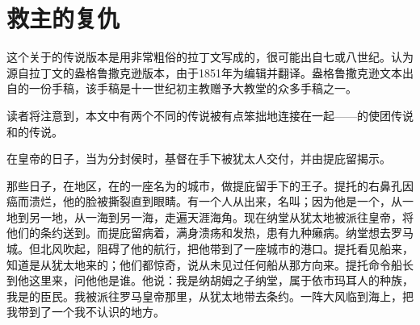 
\chapter{救主的复仇}


这个关于的传说版本是用非常粗俗的拉丁文写成的，很可能出自七或八世纪。认为源自拉丁文的盎格鲁撒克逊版本，由于1851年为编辑并翻译。盎格鲁撒克逊文本出自的一份手稿，该手稿是十一世纪初主教赠予大教堂的众多手稿之一。\par

读者将注意到，本文中有两个不同的传说被有点笨拙地连接在一起——的使团传说和的传说。\par

在皇帝的日子，当为分封侯时，基督在手下被犹太人交付，并由提庇留揭示。\par

那些日子，在地区，在的一座名为的城市，做提庇留手下的王子。提托的右鼻孔因癌而溃烂，他的脸被撕裂直到眼睛。有一个人从出来，名叫；因为他是一个，从一地到另一地，从一海到另一海，走遍天涯海角。现在纳堂从犹太地被派往皇帝，将他们的条约送到。而提庇留病着，满身溃疡和发热，患有九种癞病。纳堂想去罗马城。但北风吹起，阻碍了他的航行，把他带到了一座城市的港口。提托看见船来，知道是从犹太地来的；他们都惊奇，说从未见过任何船从那方向来。提托命令船长到他这里来，问他他是谁。他说：我是纳胡姆之子纳堂，属于依市玛耳人的种族，我是的臣民。我被派往罗马皇帝那里，从犹太地带去条约。一阵大风临到海上，把我带到了一个我不认识的地方。\par

